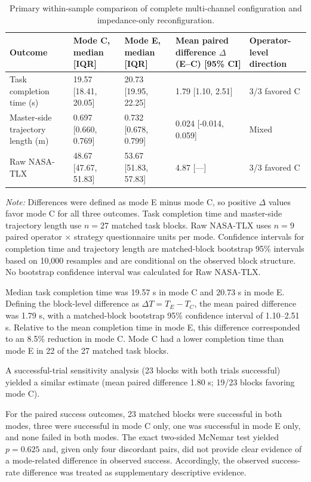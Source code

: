\begin{table}[!t]
\centering
\caption{Primary within-sample comparison of complete multi-channel configuration and impedance-only reconfiguration.}
\label{tab:9}
\small
\setlength{\tabcolsep}{5pt}
\renewcommand{\arraystretch}{1.16}
\begin{tabularx}{\textwidth}{@{}p{}YYYp{0.20\textwidth}@{}}
\toprule
Outcome & Mode C, median [IQR] & Mode E, median [IQR] & Mean paired difference $\Delta$ (E--C) [95\% CI] & Operator-level direction \\
\midrule
Task completion time (s) & 19.57 [18.41, 20.05] & 20.73 [19.95, 22.25] & 1.79 [1.10, 2.51] & 3/3 favored C \\
Master-side trajectory length (m) & 0.697 [0.660, 0.769] & 0.732 [0.678, 0.799] & 0.024 [-0.014, 0.059] & Mixed \\
Raw NASA-TLX & 48.67 [47.67, 51.83] & 53.67 [51.83, 57.83] & 4.87 [---] & 3/3 favored C \\
\bottomrule
\end{tabularx}
\par\smallskip
\footnotesize\textit{Note:} Differences were defined as mode E minus mode C, so positive $\Delta$ values favor mode C for all three outcomes. Task completion time and master-side trajectory length use $n=27$ matched task blocks. Raw NASA-TLX uses $n=9$ paired operator $\times$ strategy questionnaire units per mode. Confidence intervals for completion time and trajectory length are matched-block bootstrap 95\% intervals based on 10{,}000 resamples and are conditional on the observed block structure. No bootstrap confidence interval was calculated for Raw NASA-TLX.
\end{table}
Median task completion time was 19.57 s in mode C and 20.73 s in mode E. Defining the block-level difference as $\Delta T=T_E-T_C$, the mean paired difference was 1.79 s, with a matched-block bootstrap 95\% confidence interval of 1.10--2.51 s. Relative to the mean completion time in mode E, this difference corresponded to an 8.5\% reduction in mode C. Mode C had a lower completion time than mode E in 22 of the 27 matched task blocks.

A successful-trial sensitivity analysis (23 blocks with both trials successful) yielded a similar estimate (mean paired difference 1.80 s; 19/23 blocks favoring mode C).

For the paired success outcomes, 23 matched blocks were successful in both modes, three were successful in mode C only, one was successful in mode E only, and none failed in both modes. The exact two-sided McNemar test yielded $p=0.625$ and, given only four discordant pairs, did not provide clear evidence of a mode-related difference in observed success. Accordingly, the observed success-rate difference was treated as supplementary descriptive evidence.


